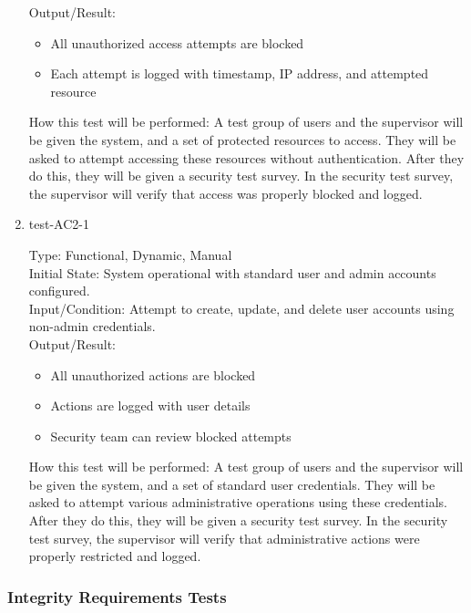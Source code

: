 \documentclass[12pt, titlepage]{article}
\begin{document}
\begin{enumerate}
    Output/Result: 
    \begin{itemize}
        \item All unauthorized access attempts are blocked
        \item Each attempt is logged with timestamp, IP address, and attempted resource
    \end{itemize}
    
    How this test will be performed: A test group of users and the supervisor will be given the system, and a set of protected resources to access. They will be asked to attempt accessing these resources without authentication. After they do this, they will be given a security test survey. In the security test survey, the supervisor will verify that access was properly blocked and logged.


    \item{test-AC2-1\\}  \label{test-AC2-1}
    
    Type: Functional, Dynamic, Manual\\
    
    Initial State: System operational with standard user and admin accounts configured.\\
    
    Input/Condition: Attempt to create, update, and delete user accounts using non-admin credentials.\\
    
    Output/Result:
    \begin{itemize}
        \item All unauthorized actions are blocked
        \item Actions are logged with user details
        \item Security team can review blocked attempts
    \end{itemize}
    
    How this test will be performed: A test group of users and the supervisor will be given the system, and a set of standard user credentials. They will be asked to attempt various administrative operations using these credentials. After they do this, they will be given a security test survey. In the security test survey, the supervisor will verify that administrative actions were properly restricted and logged.

\end{enumerate}


\subsubsection{Integrity Requirements Tests} \label{section:4.3.2}
\end{document}
